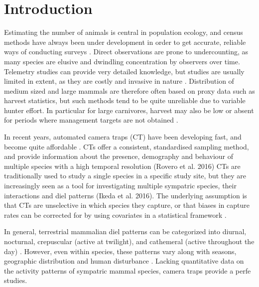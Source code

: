 \chapter{Introduction}
Estimating the number of animals is central in population ecology, and census methods have always been under development in order to get accurate, reliable ways of conducting surveys \autocite{morellet2011}.
Direct observations are prone to undercounting, as many species are elusive and dwindling concentration by observers over time. Telemetry studies can provide very detailed knowledge, but studies are usually limited in extent, as they are costly and invasive in nature \autocite{Ikeda2016}. %
Distribution of medium sized and large mammals are therefore often based on proxy data such as harvest statistics, but such methods tend to be quite unreliable due to variable hunter effort. In particular for large carnivores, harvest may also be low or absent for periods where management targets are not obtained \autocite{morellet2011}.


In recent years, automated camera traps (CT) have been developing fast, and become quite affordable \autocite{Burton2015}. 
CTs offer a consistent, standardised sampling method, and provide information about the presence, demography and behaviour of multiple species with a high temporal resolution (Rovero et al. 2016) %
CTs are traditionally used to study a single species in a specific study site, but they are increasingly seen as a tool for investigating multiple sympatric species, their interactions and diel patterns (Ikeda et al. 2016). %
The underlying assumption is that CTs are unselective in which species they capture, or that biases in capture rates can be corrected for by using covariates in a statistical framework \autocite{Rovero2013}. %

In general, terrestrial mammalian diel patterns can be categorized into diurnal, nocturnal, crepuscular (active at twilight), and cathemeral (active throughout the day) \autocite{Ikeda2016}.  
However, even within species, these patterns vary along with seasons, geographic distribution and human disturbance \autocite{Kamler2007, Gaynor2018}.
Lacking quantitative data on the activity patterns of sympatric mammal species, camera traps provide a perfe studies\autocite{Ikeda2016}.

